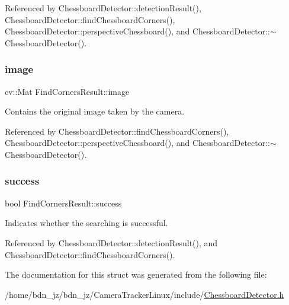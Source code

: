 Referenced by Chessboard\+Detector\+::detection\+Result(), Chessboard\+Detector\+::find\+Chessboard\+Corners(), Chessboard\+Detector\+::perspective\+Chessboard(), and Chessboard\+Detector\+::$\sim$\+Chessboard\+Detector().

\mbox{\label{structFindCornersResult_a8c2fd90c9f86bed108eb777fd237f113}} 
\subsubsection{\texorpdfstring{image}{image}}
{\footnotesize\ttfamily cv\+::\+Mat Find\+Corners\+Result\+::image}

Contains the original image taken by the camera. 

Referenced by Chessboard\+Detector\+::find\+Chessboard\+Corners(), Chessboard\+Detector\+::perspective\+Chessboard(), and Chessboard\+Detector\+::$\sim$\+Chessboard\+Detector().

\mbox{\label{structFindCornersResult_a53a6b5d4fc0243582800d92b2bc5e706}} 
\subsubsection{\texorpdfstring{success}{success}}
{\footnotesize\ttfamily bool Find\+Corners\+Result\+::success}

Indicates whether the searching is successful. 

Referenced by Chessboard\+Detector\+::detection\+Result(), and Chessboard\+Detector\+::find\+Chessboard\+Corners().



The documentation for this struct was generated from the following file\+:\begin{DoxyCompactItemize}
\item 
/home/bdn\+\_\+jz/bdn\+\_\+jz/\+Camera\+Tracker\+Linux/include/\hyperlink{ChessboardDetector_8h}{Chessboard\+Detector.\+h}\end{DoxyCompactItemize}
